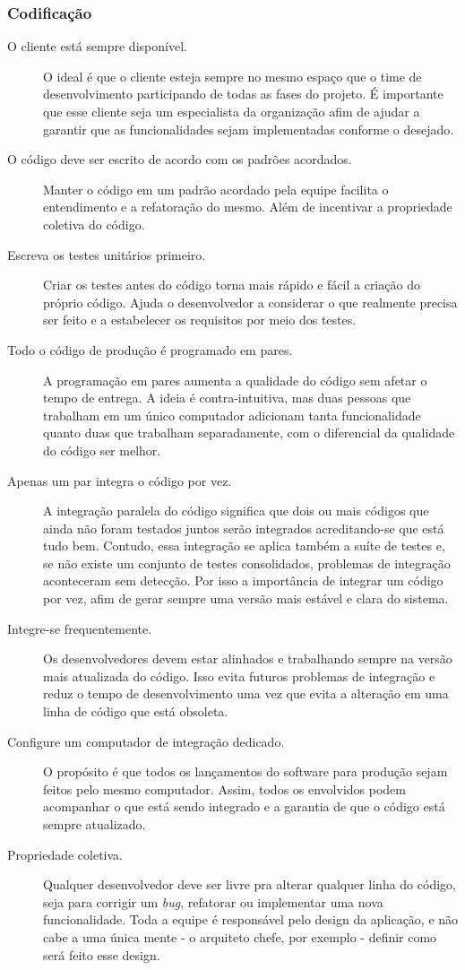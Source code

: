\subsubsection{Codificação}
\begin{description}
    \item[O cliente está sempre disponível.] O ideal é que o cliente esteja sempre
    no mesmo espaço que o time de desenvolvimento participando de todas as fases
    do projeto. É importante que esse cliente seja um especialista da organização
    afim de ajudar a garantir que as funcionalidades sejam implementadas conforme
    o desejado.
    \item[O código deve ser escrito de acordo com os padrões acordados.] Manter o
    código em um padrão acordado pela equipe facilita o entendimento e a refatoração
    do mesmo. Além de incentivar a propriedade coletiva do código.
    \item[Escreva os testes unitários primeiro.] Criar os testes antes do código
    torna mais rápido e fácil a criação do próprio código. Ajuda o desenvolvedor a
    considerar o que realmente precisa ser feito e a estabelecer os requisitos por
    meio dos testes.
    \item[Todo o código de produção é programado em pares.] A programação em pares
    aumenta a qualidade do código sem afetar o tempo de entrega. A ideia é
    contra-intuitiva, mas duas pessoas que trabalham em um único computador adicionam
    tanta funcionalidade quanto duas que trabalham separadamente, com o diferencial
    da qualidade do código ser melhor.
    \item[Apenas um par integra o código por vez.] A integração paralela do código
    significa que dois ou mais códigos que ainda não foram testados juntos serão
    integrados acreditando-se que está tudo bem. Contudo, essa integração se aplica
    também a suíte de testes e, se não existe um conjunto de testes consolidados,
    problemas de integração aconteceram sem detecção. Por isso a importância de
    integrar um código por vez, afim de gerar sempre uma versão mais estável e clara
    do sistema.
    \item[Integre-se frequentemente.] Os desenvolvedores devem estar alinhados e
    trabalhando sempre na versão mais atualizada do código. Isso evita futuros
    problemas de integração e reduz o tempo de desenvolvimento uma vez que evita
    a alteração em uma linha de código que está obsoleta.
    \item[Configure um computador de integração dedicado.] O propósito é que todos os
    lançamentos do software para produção sejam feitos pelo mesmo computador. Assim,
    todos os envolvidos podem acompanhar o que está sendo integrado e a garantia de
    que o código está sempre atualizado.
    \item[Propriedade coletiva.] Qualquer desenvolvedor deve ser livre pra alterar
    qualquer linha do código, seja para corrigir um \textit{bug}, refatorar ou
    implementar uma nova funcionalidade. Toda a equipe é responsável pelo design da
    aplicação, e não cabe a uma única mente - o arquiteto chefe, por exemplo - definir
    como será feito esse design.
\end{description}

